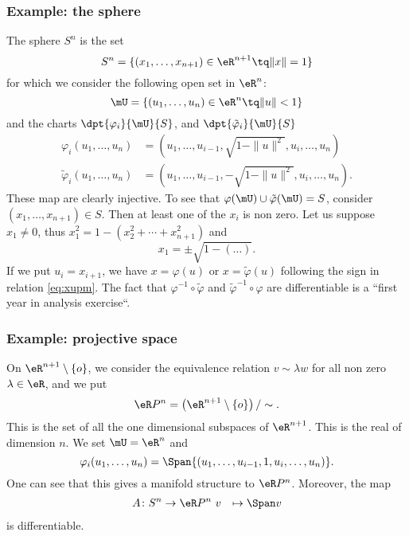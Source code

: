 \subsubsection{Example: the sphere}

The sphere $S^n$ is the set
\[
	S^n=\{  (x_1,\ldots, x_{n+1})\in\eR^{n+1}\tq \|x\|=1  \}
\]
for which we consider the following open set in $\eR^n$:
\[
	\mU=\{  (u_1,\ldots,u_n)\in\eR^n\tq\|u\|<1  \}
\]
and the charts $\dpt{\varphi_i}{\mU}{S}$, and $\dpt{\tilde{\varphi}_i}{\mU}{S}$
\begin{subequations}
	\begin{align}
		\varphi_i(u_1,\ldots,u_n)         & =(u_1,\ldots,u_{i-1}, \sqrt{  1-\|u\|^2  },u_i,\ldots,u_n )   \\
		\tilde{\varphi}_i(u_1,\ldots,u_n) & =(u_1,\ldots,u_{i-1}, -\sqrt{  1-\|u\|^2  },u_i,\ldots,u_n ).
	\end{align}
\end{subequations}
These map are clearly injective. To see that $\varphi(\mU)\cup\tilde{\varphi}(\mU)=S$, consider $(x_1,\ldots,x_{n+1})\in S$. Then at least one of the $x_i$ is non zero. Let us suppose $x_1\neq 0$, thus $x_1^2=1-(x_2^2+\cdots+x_{n+1}^2)$ and
\begin{equation}\label{eq:xupm}
	x_1=\pm\sqrt{1-(\ldots)}.
\end{equation}
If we put $u_i=x_{i+1}$, we have $x=\varphi(u)$ or $x=\tilde{\varphi}(u)$ following the sign in relation \eqref{eq:xupm}. The fact that $\varphi^{-1}\circ\tilde{\varphi}$ and $\tilde{\varphi}^{-1}\circ\varphi$ are differentiable is a ``first year in analysis exercise``.

\subsubsection{Example: projective space}

On $\eR^{n+1}\setminus\{o\}$, we consider the equivalence relation $v\sim\lambda w$ for all non zero $\lambda\in\eR$, and we put
\[
	\eR P^n=\left(\eR^{n+1}\setminus\{o\}\right)/\sim.
\]
This is the set of all the one dimensional subspaces of $\eR^{n+1}$. This is the real  of dimension $n$. We set $\mU=\eR^n$ and
\[
	\varphi_i(u_1,\ldots,u_n)=\Span\{ (u_1,\ldots,u_{i-1},1,u_i,\ldots,u_n) \}.
\]
One can see that this gives a manifold structure to $\eR P^n$. Moreover, the map
\begin{equation}
	\begin{aligned}
		A \colon S^n & \to \eR P^n\
		v            & \mapsto \Span v
	\end{aligned}
\end{equation}
is differentiable.

